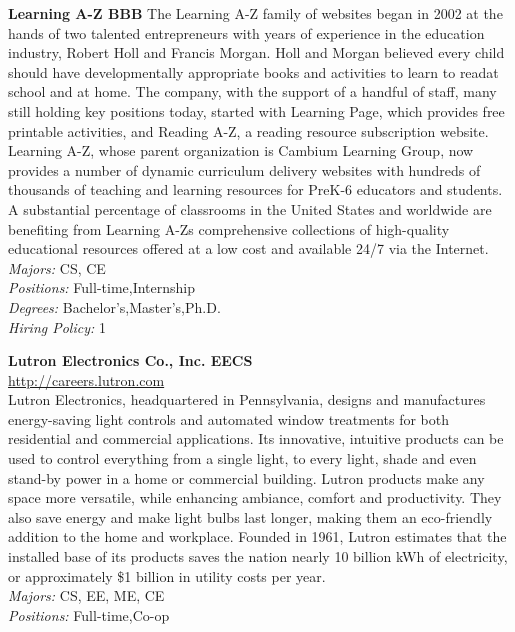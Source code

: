 \documentclass[twoside]{article}
\begin{document}
\begin{center}
\begin{multicols}{2}
\begin{minipage}{.95\columnwidth}{\Large\bf Learning A-Z \hfill BBB}
    The Learning A-Z family of websites began in 2002 at the hands of two talented entrepreneurs with years of experience in the education industry, Robert Holl and Francis Morgan. Holl and Morgan believed every child should have developmentally appropriate books and activities to learn to readat school and at home. The company, with the support of a handful of staff, many still holding key positions today, started with Learning Page, which provides free printable activities, and Reading A-Z, a reading resource subscription website. Learning A-Z, whose parent organization is Cambium Learning Group, now provides a number of dynamic curriculum delivery websites with hundreds of thousands of teaching and learning resources for PreK-6 educators and students. A substantial percentage of classrooms in the United States and worldwide are benefiting from Learning A-Zs comprehensive collections of high-quality educational resources offered at a low cost and available 24/7 via the Internet.\\
    \emph{Majors:} CS, CE\\
    \emph{Positions:} Full-time,Internship\\
    \emph{Degrees:} Bachelor's,Master's,Ph.D.\\
    \emph{Hiring Policy:} 1\\
\end{minipage}
 \begin{minipage}{.95\columnwidth}{\Large\bf Lutron Electronics Co., Inc. \hfill EECS}\\
    \url{http://careers.lutron.com}\\
    Lutron Electronics, headquartered in Pennsylvania, designs and manufactures energy-saving light controls and automated window treatments for both residential and commercial applications. Its innovative, intuitive products can be used to control everything from a single light, to every light, shade and even stand-by power in a home or commercial building. Lutron products make any space more versatile, while enhancing ambiance, comfort and productivity. They also save energy and make light bulbs last longer, making them an eco-friendly addition to the home and workplace. Founded in 1961, Lutron estimates that the installed base of its products saves the nation nearly 10 billion kWh of electricity, or approximately \$1 billion in utility costs per year.\\
    \emph{Majors:} CS, EE, ME, CE\\
    \emph{Positions:} Full-time,Co-op\\

\end{minipage}
\end{multicols}
\end{center}
\end{document}
